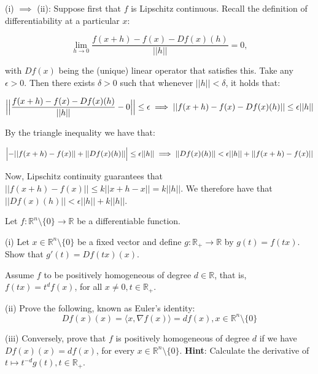 \begin{solution}
    
    (i) $\implies$ (ii): Suppose first that $f$ is Lipschitz continuous.
    Recall the definition of differentiability at a particular $x$:

    $$\lim_{h \rightarrow 0} \frac{f(x + h) - f(x) - D f(x)(h)}{\lvert \lvert h \rvert \rvert} = 0,$$

    with $Df(x)$ being the (unique) linear operator that satisfies this.
    Take any $\epsilon > 0$.
    Then there exists $\delta > 0$ such that whenever $\lvert \lvert h \rvert \rvert < \delta$, it holds that:

    $$\Bigl\lvert \Bigl\lvert \frac{f(x + h) - f(x) - Df(x)(h)}{\lvert \lvert h \rvert \rvert} - 0 \Bigr \rvert \Bigr \rvert \leq \epsilon \implies \lvert \lvert f(x + h) - f(x) - Df(x)(h) \rvert \rvert \leq \epsilon \lvert \lvert h \rvert \rvert$$

    By the triangle inequality we have that:

    $$\Bigl \lvert - \lvert \lvert f(x+h) - f(x) \rvert \rvert + \lvert \lvert Df(x)(h) \rvert \rvert \Bigr \rvert \leq \epsilon \lvert \lvert h \rvert \rvert \implies \lvert \lvert Df(x)(h) \rvert \rvert < \epsilon \lvert \lvert h \rvert \rvert + \lvert \lvert f(x+h) - f(x) \rvert \rvert$$

    Now, Lipschitz continuity guarantees that $\lvert \lvert f(x+h) - f(x) \rvert \rvert \leq k \lvert \lvert x + h - x \rvert \rvert = k \lvert \lvert h \rvert \rvert$.
    We therefore have that $\lvert \lvert Df(x)(h) \rvert \rvert < \epsilon \lvert \lvert h \rvert \rvert + k \lvert \lvert h \rvert \rvert$.
\end{solution}

\begin{exercise}{32}
    Let $f: \mathbb{R}^n \setminus \{0\} \rightarrow \mathbb{R}$ be a differentiable function.

    (i) Let $x \in \mathbb{R}^n \setminus \{0\}$ be a fixed vector and define $g: \mathbb{R}_{+} \rightarrow \mathbb{R}$ by $g(t) = f(tx)$.
    Show that $g'(t) = D f(tx)(x)$.

    Assume $f$ to be positively homogeneous of degree $d \in \mathbb{R}$, that is, $f(tx) = t^df(x)$, for all $x \neq 0, t \in \mathbb{R}_{+}$.

    (ii) Prove the following, known as Euler's identity:
    $$Df(x)(x) = \langle x, \nabla f(x) \rangle = d f(x), x \in \mathbb{R}^n \setminus \{0\}$$

    (iii) Conversely, prove that $f$ is positively homogeneous of degree $d$ if we have $Df(x)(x) = df(x)$, for every $x \in \mathbb{R}^n \setminus \{0\}$. \textbf{Hint}: Calculate the derivative of $t \mapsto t^{-d}g(t), t \in \mathbb{R}_{+}$.
\end{exercise}


